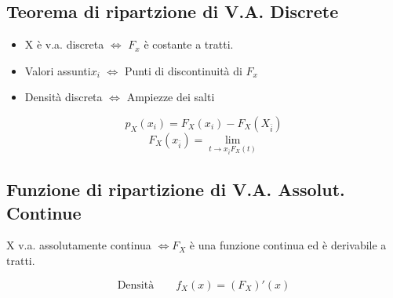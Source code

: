 	\subsection*{Teorema di ripartzione di V.A. Discrete}
	\begin{itemize}
		\item X è v.a. discreta $\Leftrightarrow$ $F_x$ è costante a tratti.
		\item Valori assunti{$x_i$} $\Leftrightarrow$ Punti di discontinuità  di $F_x$
		\item Densità discreta $\Leftrightarrow$ Ampiezze dei salti
	\end{itemize}
	\begin{equation*}
		p_X (x_i) = F_X(x_i) - F_X(X_{\bar{i}})
	\end{equation*}
	\begin{equation*}
		F_X(x_{\bar{i}}) = \lim_{t \to x_{\bar{i}} F_X(t)}
	\end{equation*}
	\subsection*{Funzione di ripartizione di V.A. Assolut. Continue}
	X v.a. assolutamente continua $\Leftrightarrow F_X$ è una funzione continua ed
	è derivabile a tratti.

	\begin{equation}
		\text{Densità} \qquad f_X(x) = (F_X)'(x)
	\end{equation}

